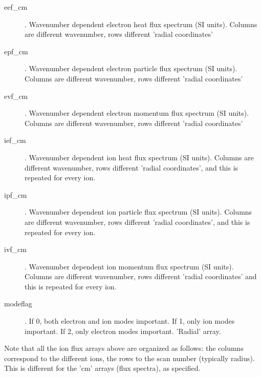 \documentclass{article}
\begin{document}
\begin{description}
\item[eef\_cm]. Wavenumber dependent electron heat flux spectrum (SI units). Columns are different wavenumber, rows different 'radial coordinates'
\item[epf\_cm]. Wavenumber dependent electron particle flux spectrum (SI units). Columns are different wavenumber, rows different 'radial coordinates'
\item[evf\_cm]. Wavenumber dependent electron momentum flux spectrum (SI units). Columns are different wavenumber, rows different 'radial coordinates'
\item[ief\_cm]. Wavenumber dependent ion heat flux spectrum (SI units). Columns are different wavenumber, rows different 'radial coordinates', and this is repeated for every ion. 
\item[ipf\_cm]. Wavenumber dependent ion particle flux spectrum (SI units). Columns are different wavenumber, rows different 'radial coordinates', and this is repeated for every ion.
\item[ivf\_cm]. Wavenumber dependent ion momentum flux spectrum (SI units). Columns are different wavenumber, rows different 'radial coordinates' and this is repeated for every ion.
\item[modeflag]. If 0, both electron and ion modes important. If 1, only ion modes important. If 2, only electron modes important. 'Radial' array. 

\end{description} 

Note that all the ion flux arrays above are organized as follows: the columns correspond to the different ions, the rows to the scan number (typically radius). This is different for the 'cm' arrays (flux spectra), as specified.
\end{document}
